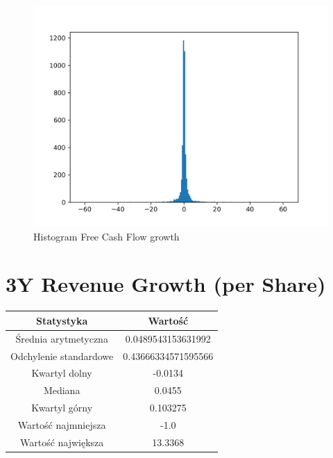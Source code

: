 \documentclass{article}
\begin{document}
\begin{figure}[h!]
    \includegraphics[width=\linewidth]{variables/Free Cash Flow growth.png}
    \caption{Histogram Free Cash Flow growth }
\end{figure}\section{ 3Y Revenue Growth (per Share) }

\begin{center}
    \begin{tabular}{|c | c|} 
    \hline
    Statystyka & Wartość \\
    \hline\hline
    Średnia arytmetyczna & 0.0489543153631992 \\ 
    \hline
    Odchylenie standardowe & 0.43666334571595566 \\
    \hline
    Kwartyl dolny & -0.0134 \\
    \hline
    Mediana & 0.0455 \\
    \hline
    Kwartyl górny & 0.103275 \\
    \hline
    Wartość najmniejsza & -1.0 \\
    \hline
    Wartość największa & 13.3368 \\
    \hline
   \end{tabular}
\end{center}
\end{document}
